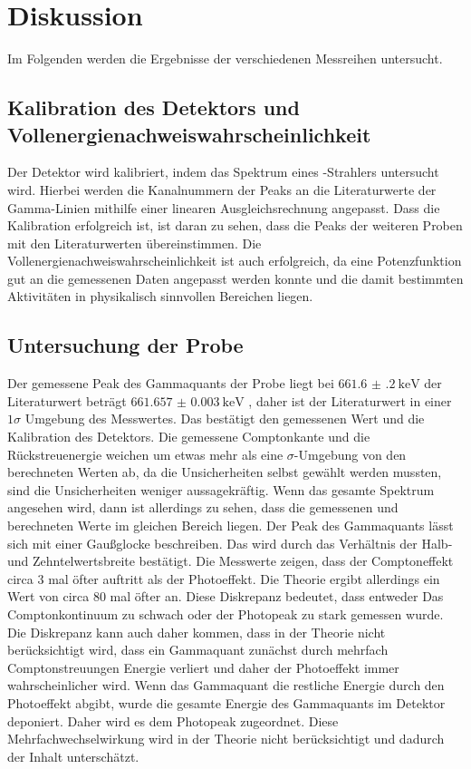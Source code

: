 \section{Diskussion}
\label{sec:Diskussion}
Im Folgenden werden die Ergebnisse der verschiedenen Messreihen untersucht.

\subsection{Kalibration des Detektors und Vollenergienachweiswahrscheinlichkeit}
Der Detektor wird kalibriert, indem das Spektrum eines -Strahlers untersucht wird.
Hierbei werden die Kanalnummern der Peaks an die Literaturwerte \cite{Gamma_lit} der Gamma-Linien mithilfe einer linearen 
Ausgleichsrechnung angepasst. Dass die Kalibration erfolgreich ist, ist daran zu sehen, dass die Peaks der weiteren
Proben mit den Literaturwerten übereinstimmen.
Die Vollenergienachweiswahrscheinlichkeit ist auch erfolgreich, da eine Potenzfunktion gut an die gemessenen Daten angepasst werden konnte und die 
damit bestimmten Aktivitäten in physikalisch sinnvollen Bereichen liegen. 

\subsection{Untersuchung der  Probe}
Der gemessene Peak des Gammaquants der  Probe liegt bei $\SI{661.6(2)}{\kilo\eV}$ der Literaturwert beträgt $\SI{661.657(3)}{\kilo\eV}$ \cite{Gamma_lit},
daher ist der Literaturwert in einer $1\sigma$ Umgebung des Messwertes. Das bestätigt den gemessenen Wert und die Kalibration des 
Detektors.
Die gemessene Comptonkante und die Rückstreuenergie weichen um etwas mehr als eine $\sigma$-Umgebung von den berechneten Werten ab, da die 
Unsicherheiten selbst gewählt werden mussten, sind die Unsicherheiten weniger aussagekräftig.
Wenn das gesamte Spektrum angesehen wird, dann ist allerdings 
zu sehen, dass die gemessenen und berechneten Werte im gleichen Bereich liegen.
Der Peak des Gammaquants lässt sich mit einer Gaußglocke beschreiben. Das wird durch das Verhältnis der Halb- und Zehntelwertsbreite 
bestätigt. 
Die Messwerte zeigen, dass der Comptoneffekt circa 3 mal öfter auftritt als der Photoeffekt. Die Theorie ergibt allerdings 
ein Wert von circa 80 mal öfter an. Diese Diskrepanz bedeutet, dass entweder Das Comptonkontinuum zu schwach oder der Photopeak
zu stark gemessen wurde. 
Die Diskrepanz kann auch daher kommen, dass in der Theorie nicht berücksichtigt wird, dass ein Gammaquant zunächst durch mehrfach
Comptonstreuungen Energie verliert und daher der Photoeffekt immer wahrscheinlicher wird. Wenn das Gammaquant  
die restliche Energie durch den Photoeffekt abgibt, wurde die gesamte Energie des Gammaquants im Detektor deponiert. Daher wird es 
dem Photopeak zugeordnet. Diese Mehrfachwechselwirkung wird in der Theorie nicht berücksichtigt und dadurch der Inhalt 
unterschätzt.
